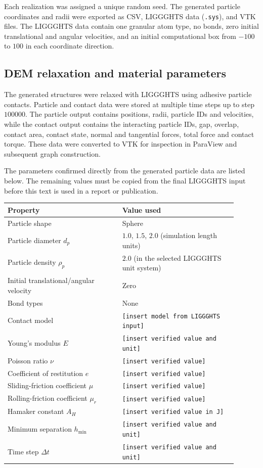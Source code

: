 Each realization was assigned a unique random seed. The generated particle
coordinates and radii were exported as CSV, LIGGGHTS data (\texttt{.sys}), and
VTK files. The LIGGGHTS data contain one granular atom type, no bonds, zero
initial translational and angular velocities, and an initial computational box
from $-100$ to $100$ in each coordinate direction.

\subsection{DEM relaxation and material parameters}

The generated structures were relaxed with LIGGGHTS using adhesive particle
contacts. Particle and contact data were stored at multiple time steps up to
step $100000$. The particle output contains positions, radii, particle IDs and
velocities, while the contact output contains the interacting particle IDs,
gap, overlap, contact area, contact state, normal and tangential forces, total
force and contact torque. These data were converted to VTK for inspection in
ParaView and subsequent graph construction.

The parameters confirmed directly from the generated particle data are listed
below. The remaining values must be copied from the final LIGGGHTS input before
this text is used in a report or publication.

\begin{center}
\begin{tabular}{|p{0.45\linewidth}|p{0.45\linewidth}|}
\hline
Property & Value used \\
\hline
Particle shape & Sphere \\
Particle diameter $d_p$ & $1.0$, $1.5$, $2.0$ (simulation length units) \\
Particle density $\rho_p$ & $2.0$ (in the selected LIGGGHTS unit system) \\
Initial translational/angular velocity & Zero \\
Bond types & None \\
Contact model & \texttt{[insert model from LIGGGHTS input]} \\
Young's modulus $E$ & \texttt{[insert verified value and unit]} \\
Poisson ratio $\nu$ & \texttt{[insert verified value]} \\
Coefficient of restitution $e$ & \texttt{[insert verified value]} \\
Sliding-friction coefficient $\mu$ & \texttt{[insert verified value]} \\
Rolling-friction coefficient $\mu_r$ & \texttt{[insert verified value]} \\
Hamaker constant $A_H$ & \texttt{[insert verified value in J]} \\
Minimum separation $h_{\min}$ & \texttt{[insert verified value and unit]} \\
Time step $\Delta t$ & \texttt{[insert verified value and unit]} \\
\hline
\end{tabular}
\end{center}


